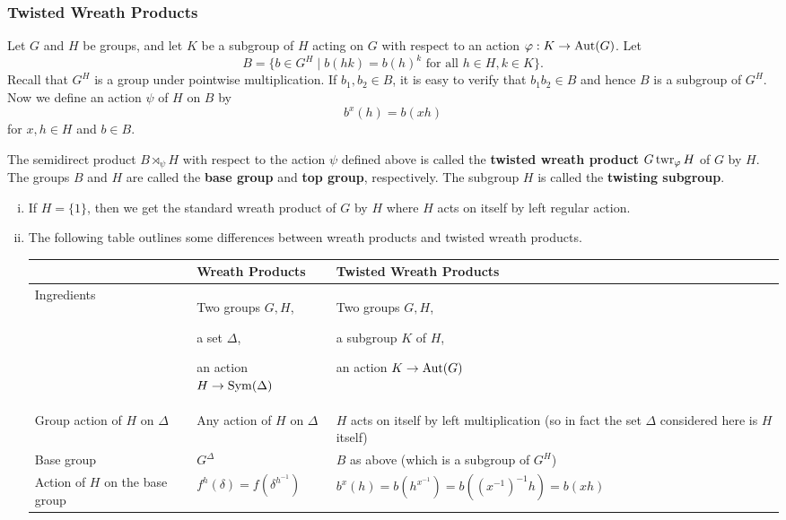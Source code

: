 \subsubsection{Twisted Wreath Products} 
Let $G$ and $H$ be groups, and let $K$ be a subgroup of $H$ acting on $G$ with respect to an action $\varphi:K\rightarrow \operatorname{Aut} (G)$. Let 
\begin{equation*}
	B = \{b\in G^H\mid b(hk) = b(h)^k\text{ for all }h\in H,k\in K\}.
\end{equation*}
Recall that $G^H$ is a group under pointwise multiplication. If $b_1,b_2\in B$, it is easy to verify that $b_1b_2\in B$ and hence $B$ is a subgroup of $G^H$. Now we define an action $\psi$ of $H$ on $B$ by
\begin{equation*}
	b^x(h) = b(xh)
\end{equation*}
for $x,h\in H$ and $b\in B$.
\begin{definition}
	The semidirect product $B\rtimes_\psi H$ with respect to the action $\psi$ defined above is called the \textbf{twisted wreath product} $G\operatorname{twr}_\varphi H$ of $G$ by $H$. The groups $B$ and $H$ are called the \textbf{base group} and \textbf{top group}, respectively. The subgroup $H$ is called the \textbf{twisting subgroup}.
\end{definition}
\begin{remark}
	\begin{enumerate}[(i)]
		\item If $H = \{1\}$, then we get the standard wreath product of $G$ by $H$ where $H$ acts on itself by left regular action.
		\item The following table outlines some differences between wreath products and twisted wreath products.
\begin{center}
	\begin{tabular}{|p{1.7cm}|p{3.6cm}|p{5.2cm}|}
		\hline
		  & Wreath Products & Twisted Wreath Products  \\
\hline \hline
Ingredients & Two groups $G,H$, 

a set $\Delta$, 

an action $H\to\operatorname{Sym}(\Delta)$ & Two groups $G,H$,

a subgroup $K$ of $H$,

an action $K\to \operatorname{Aut}(G)$  \\
\hline
Group action of $H$ on $\Delta$ & Any action of $H$ on $\Delta$ & $H$ acts on itself by left multiplication (so in fact the set $\Delta$ considered here is $H$ itself) \\
\hline
Base group & $G^\Delta$ & $B$ as above (which is a subgroup of $G^H$) \\
\hline
Action of $H$ on the base group & $f^h(\delta) = f(\delta^{h^{-1}})$ & $b^x(h) = b(h^{x^{-1}}) = b((x^{-1})^{-1}h) = b(xh)$ \\
\hline
\end{tabular}
\end{center}
\end{enumerate}
\end{remark}


